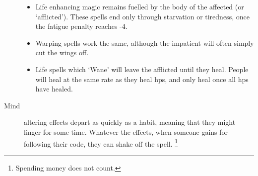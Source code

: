 \begin{multicols}{2}
\begin{description}
  \begin{itemize}
    \item
    Life enhancing magic remains fuelled by the body of the affected (or `afflicted').
    These spells end only through starvation or tiredness, once the \gls{fatigue} penalty reaches -4.
    \item
    Warping spells work the same, although the impatient will often simply cut the wings off.
    \item
    Life spells which `Wane' will leave the afflicted until they heal.
    People will heal at the same rate as they heal \glspl{hp}, and only heal once all \glspl{hp} have healed.
  \end{itemize}
  \item[Mind]
  altering effects depart as quickly as a habit, meaning that they might linger for some time.
  Whatever the effects, when someone gains  for following their code, they can shake off the spell.%
  \footnote{Spending money does not count.}
\end{description}

\end{multicols}

